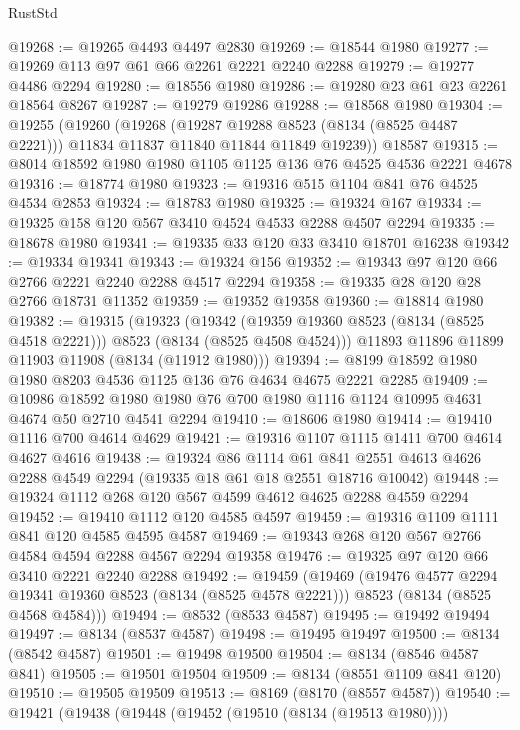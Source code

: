 \begin{lexlean}{RustStd}
\begin{coremodule}
{\begin{coremodule}
{{{{{{{{{{{{{{{{{{{{{{{{{{{{{{{{{{{{{{{{{{{{{{{{{{{{{@19268 := @19265 @4493 @4497 @2830
@19269 := @18544 @1980
@19277 := @19269 @113 @97 @61 @66 @2261 @2221 @2240 @2288
@19279 := @19277 @4486 @2294
@19280 := @18556 @1980
@19286 := @19280 @23 @61 @23 @2261 @18564 @8267
@19287 := @19279 @19286
@19288 := @18568 @1980
@19304 := @19255
    (@19260
      (@19268
        (@19287 @19288 @8523 (@8134 (@8525 @4487 @2221)))
        @11834
        @11837
        @11840
        @11844
        @11849
        @19239))
    @18587
@19315 := @8014 @18592 @1980 @1980 @1105 @1125 @136 @76 @4525 @4536 @2221 @4678
@19316 := @18774 @1980
@19323 := @19316 @515 @1104 @841 @76 @4525 @4534 @2853
@19324 := @18783 @1980
@19325 := @19324 @167
@19334 := @19325 @158 @120 @567 @3410 @4524 @4533 @2288 @4507 @2294
@19335 := @18678 @1980
@19341 := @19335 @33 @120 @33 @3410 @18701 @16238
@19342 := @19334 @19341
@19343 := @19324 @156
@19352 := @19343 @97 @120 @66 @2766 @2221 @2240 @2288 @4517 @2294
@19358 := @19335 @28 @120 @28 @2766 @18731 @11352
@19359 := @19352 @19358
@19360 := @18814 @1980
@19382 := @19315
    (@19323
      (@19342 (@19359 @19360 @8523 (@8134 (@8525 @4518 @2221))) @8523 (@8134 (@8525 @4508 @4524)))
      @11893
      @11896
      @11899
      @11903
      @11908
      (@8134 (@11912 @1980)))
@19394 := @8199 @18592 @1980 @1980 @8203 @4536 @1125 @136 @76 @4634 @4675 @2221 @2285
@19409 := @10986
    @18592
    @1980
    @1980
    @76
    @700
    @1980
    @1116
    @1124
    @10995
    @4631
    @4674
    @50
    @2710
    @4541
    @2294
@19410 := @18606 @1980
@19414 := @19410 @1116 @700 @4614 @4629
@19421 := @19316 @1107 @1115 @1411 @700 @4614 @4627 @4616
@19438 := @19324
    @86
    @1114
    @61
    @841
    @2551
    @4613
    @4626
    @2288
    @4549
    @2294
    (@19335 @18 @61 @18 @2551 @18716 @10042)
@19448 := @19324 @1112 @268 @120 @567 @4599 @4612 @4625 @2288 @4559 @2294
@19452 := @19410 @1112 @120 @4585 @4597
@19459 := @19316 @1109 @1111 @841 @120 @4585 @4595 @4587
@19469 := @19343 @268 @120 @567 @2766 @4584 @4594 @2288 @4567 @2294 @19358
@19476 := @19325 @97 @120 @66 @3410 @2221 @2240 @2288
@19492 := @19459
    (@19469
      (@19476 @4577 @2294 @19341 @19360 @8523 (@8134 (@8525 @4578 @2221)))
      @8523
      (@8134 (@8525 @4568 @4584)))
@19494 := @8532 (@8533 @4587)
@19495 := @19492 @19494
@19497 := @8134 (@8537 @4587)
@19498 := @19495 @19497
@19500 := @8134 (@8542 @4587)
@19501 := @19498 @19500
@19504 := @8134 (@8546 @4587 @841)
@19505 := @19501 @19504
@19509 := @8134 (@8551 @1109 @841 @120)
@19510 := @19505 @19509
@19513 := @8169 (@8170 (@8557 @4587))
@19540 := @19421
    (@19438
      (@19448
        (@19452 (@19510 (@8134 (@19513 @1980))))
}}}}}}}}}}}}}}}}}}}}}}}}}}}}}}}}}}}}}}}}}}}}}}}}}}}}}
\end{coremodule}}
\end{coremodule}
\end{lexlean}
